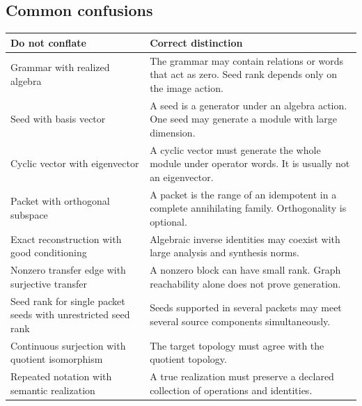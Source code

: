 \subsection{Common confusions}
\begin{center}
\begin{longtable}{@{}>{\raggedright\arraybackslash}p{}>{\raggedright\arraybackslash}p{}@{}}
\toprule
\textbf{Do not conflate} & \textbf{Correct distinction}\\
\midrule
\endhead
Grammar with realized algebra & The grammar may contain relations or words that act as zero.  Seed rank depends only on the image action.\\
Seed with basis vector & A seed is a generator under an algebra action.  One seed may generate a module with large dimension.\\
Cyclic vector with eigenvector & A cyclic vector must generate the whole module under operator words.  It is usually not an eigenvector.\\
Packet with orthogonal subspace & A packet is the range of an idempotent in a complete annihilating family.  Orthogonality is optional.\\
Exact reconstruction with good conditioning & Algebraic inverse identities may coexist with large analysis and synthesis norms.\\
Nonzero transfer edge with surjective transfer & A nonzero block can have small rank.  Graph reachability alone does not prove generation.\\
Seed rank for single packet seeds with unrestricted seed rank & Seeds supported in several packets may meet several source components simultaneously.\\
Continuous surjection with quotient isomorphism & The target topology must agree with the quotient topology.\\
Repeated notation with semantic realization & A true realization must preserve a declared collection of operations and identities.\\
\bottomrule
\end{longtable}
\end{center}

